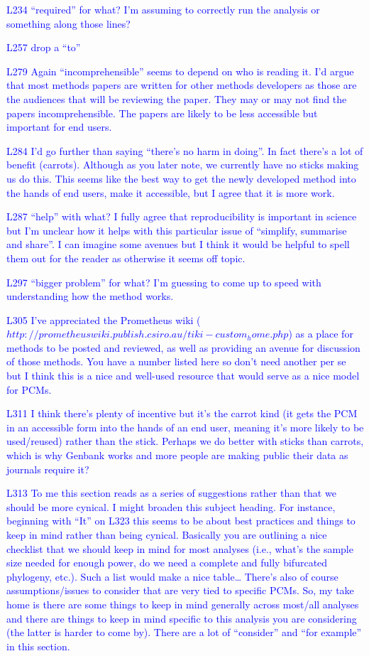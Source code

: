 \documentclass[12pt]{letter}
\begin{document}
\begin{letter}{}
\textcolor{blue}{L234 “required” for what? I’m assuming to correctly run the analysis or something along those lines?}

\textcolor{blue}{L257 drop a “to”}

\textcolor{blue}{L279 Again “incomprehensible” seems to depend on who is reading it. I’d argue that most methods papers are written for other methods developers as those are the audiences that will be reviewing the paper. They may or may not find the papers incomprehensible. The papers are likely to be less accessible but important for end users.}

\textcolor{blue}{L284 I’d go further than saying “there’s no harm in doing”. In fact there’s a lot of benefit (carrots). Although as you later note, we currently have no sticks making us do this. This seems like the best way to get the newly developed method into the hands of end users, make it accessible, but I agree that it is more work.}

\textcolor{blue}{L287 “help” with what? I fully agree that reproducibility is important in science but I’m unclear how it helps with this particular issue of “simplify, summarise and share”. I can imagine some avenues but I think it would be helpful to spell them out for the reader as otherwise it seems off topic.}

\textcolor{blue}{L297 “bigger problem” for what? I’m guessing to come up to speed with understanding how the method works.}

\textcolor{blue}{L305 I’ve appreciated the Prometheus wiki ($http://prometheuswiki.publish.csiro.au/tiki-custom_home.php$) as a place for methods to be posted and reviewed, as well as providing an avenue for discussion of those methods. You have a number listed here so don’t need another per se but I think this is a nice and well-used resource that would serve as a nice model for PCMs.}

\textcolor{blue}{L311 I think there’s plenty of incentive but it’s the carrot kind (it gets the PCM in an accessible form into the hands of an end user, meaning it’s more likely to be used/reused) rather than the stick. Perhaps we do better with sticks than carrots, which is why Genbank works and more people are making public their data as journals require it?}

\textcolor{blue}{L313 To me this section reads as a series of suggestions rather than that we should be more cynical. I might broaden this subject heading. For instance, beginning with “It” on L323 this seems to be about best practices and things to keep in mind rather than being cynical. Basically you are outlining a nice checklist that we should keep in mind for most analyses (i.e., what’s the sample size needed for enough power, do we need a complete and fully bifurcated phylogeny, etc.). Such a list would make a nice table… There’s also of course assumptions/issues to consider that are very tied to specific PCMs. So, my take home is there are some things to keep in mind generally across most/all analyses and there are things to keep in mind specific to this analysis you are considering (the latter is harder to come by). There are a lot of “consider” and “for example” in this section.}


\end{letter}
\end{document}
